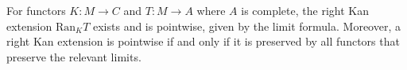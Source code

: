 For functors $K: M \to C$ and $T: M \to A$ where $A$ is complete, the right Kan extension $\mathrm{Ran}_K T$ exists and is pointwise, given by the limit formula. Moreover, a right Kan extension is pointwise if and only if it is preserved by all functors that preserve the relevant limits.
